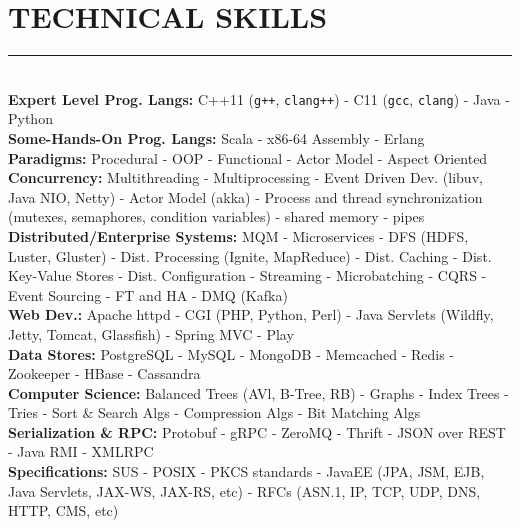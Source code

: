 \documentclass[10pt,a4paper]{article}
\begin{document}
\section{TECHNICAL SKILLS}
\noindent \rule {18.0cm}{0.2pt} \\
\noindent
\textbullet \hspace{0.1cm}\textbf{Expert Level Prog. Langs:} C++11 (\texttt{g++}, \texttt{clang++}) - C11 (\texttt{gcc}, \texttt{clang}) - Java - Python \\
\textbullet \hspace{0.1cm}\textbf{Some-Hands-On Prog. Langs:} Scala - x86-64 Assembly - Erlang \\
\textbullet \hspace{0.1cm}\textbf{Paradigms:} Procedural - OOP - Functional - Actor Model - Aspect Oriented\\
\textbullet \hspace{0.1cm}\textbf{Concurrency:} Multithreading - Multiprocessing - Event Driven Dev. (libuv, Java NIO, Netty) - Actor Model (akka) - Process and thread synchronization (mutexes, semaphores, condition variables) - shared memory - pipes \\
\textbullet \hspace{0.1cm}\textbf{Distributed/Enterprise Systems:} MQM - Microservices - DFS (HDFS, Luster, Gluster) - Dist. Processing (Ignite, MapReduce) - Dist. Caching - Dist. Key-Value Stores - Dist. Configuration - Streaming - Microbatching - CQRS - Event Sourcing - FT and HA - DMQ (Kafka)  \\
\textbullet \hspace{0.1cm}\textbf{Web Dev.:} Apache httpd - CGI (PHP, Python, Perl) - Java Servlets (Wildfly, Jetty, Tomcat, Glassfish) - Spring MVC - Play \\
\textbullet \hspace{0.1cm}\textbf{Data Stores:} PostgreSQL - MySQL - MongoDB - Memcached - Redis - Zookeeper - HBase - Cassandra \\
\textbullet \hspace{0.1cm}\textbf{Computer Science:} Balanced Trees (AVl, B-Tree, RB) - Graphs - Index Trees - Tries - Sort \& Search Algs - Compression Algs - Bit Matching Algs  \\
\textbullet \hspace{0.1cm}\textbf{Serialization \& RPC:} Protobuf - gRPC - ZeroMQ - Thrift - JSON over REST - Java RMI - XMLRPC \\
\textbullet \hspace{0.1cm}\textbf{Specifications:} SUS - POSIX - PKCS standards - JavaEE (JPA, JSM, EJB, Java Servlets, JAX-WS, JAX-RS, etc) - RFCs (ASN.1, IP, TCP, UDP, DNS, HTTP, CMS, etc) \\
\end{document}
